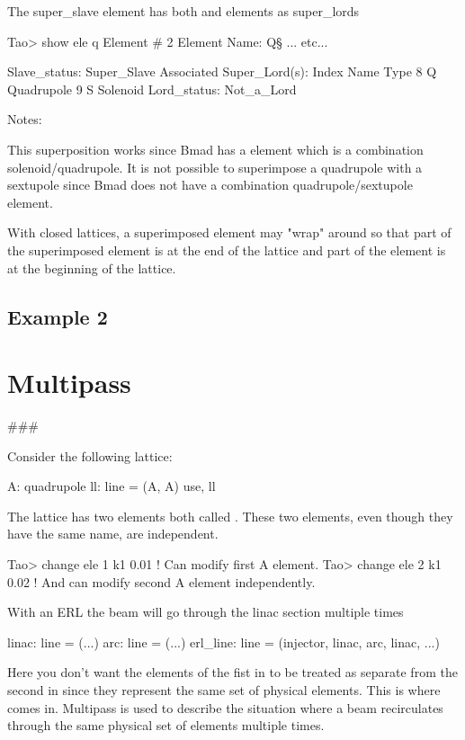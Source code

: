 \documentclass{hitec}
\newcommand{\Section}[1]{\section{#1}\vspace*{-1ex}}
\begin{document}
The  super_slave element has both  and  elements as super_lords

    Tao> show ele q\s
     Element #                2
     Element Name: Q\S
    ... etc...

    Slave_status: Super_Slave
    Associated Super_Lord(s):
       Index   Name                             Type
           8   Q                                Quadrupole
           9   S                                Solenoid
    Lord_status:  Not_a_Lord

Notes:
\item This superposition works since Bmad has a  element which is a combination solenoid/quadrupole. It is not possible
to superimpose a quadrupole with a sextupole since Bmad does not have a combination quadrupole/sextupole element.
\item With closed lattices, a superimposed element may "wrap" around so that part of the superimposed element is at the end of the lattice
and part of the element is at the beginning of the lattice.

\subsection{Example 2}


\Section{Multipass}


### 

Consider the following lattice:

    A: quadrupole
    ll: line = (A, A)
    use, ll

The lattice has two elements both called . These two elements, even though they have the same name, are independent.

    Tao> change ele 1 k1 0.01   ! Can modify first A element.
    Tao> change ele 2 k1 0.02   ! And can modify second A element independently.

With an ERL the beam will go through the linac section multiple times

    linac: line = (...)
    arc: line = (...)
    erl_line: line = (injector, linac, arc, linac, ...)

Here you don't want the elements of the fist  in  to be treated as separate
from the second  in  since they represent the same set of physical elements.
This is where  comes in.  Multipass is used to describe the situation where a beam
recirculates through the same physical set of elements multiple times.
\end{document}
